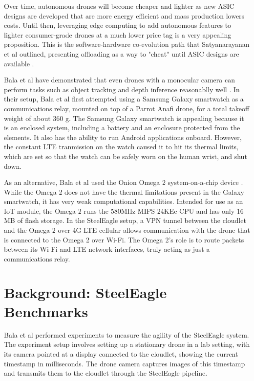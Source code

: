 Over time, autonomous drones will
become cheaper and lighter as new ASIC designs are developed that are more
energy efficient and mass production lowers costs. Until then, leveraging edge
computing to add autonomous features to lighter consumer-grade drones at a much
lower price tag is a very appealing proposition. This is the software-hardware
co-evolution path that Satyanarayanan et al outlined, presenting offloading as
a way to "cheat" until ASIC designs are available \cite{satya21}.

Bala et al have demonstrated that even drones with a monocular camera can
perform tasks such as object tracking and depth inference reasonablly
well \cite{bala2024}. In their setup, Bala et al first attempted using a Samsung
Galaxy smartwatch as a communications relay, mounted on top of a Parrot Anafi
drone, for a total takeoff weight of about 360 g. The Samsung Galaxy smartwatch
is appealing because it is an enclosed system, including a battery and an
enclosure protected from the elements. It also has the ability to run Android
applications onboard.  However, the constant LTE tranmission on the watch
caused it to hit its thermal limits, which are set so that the watch can be
safely worn on the human wrist, and shut down.

As an alternative, Bala et al used the Onion Omega 2 system-on-a-chip device
\cite{onionomega2}. While the Omega 2 does not have the thermal limitations
present in the Galaxy smartwatch, it has very weak computational capabilities.
Intended for use as an IoT module, the Omega 2 runs the 580MHz MIPS 24KEc CPU
and has only 16 MB of flash storage. In the SteelEagle setup, a VPN tunnel
between the cloudlet and the Omega 2 over 4G LTE cellular allows communication
with the drone that is connected to the Omega 2 over Wi-Fi. The Omega 2's role
is to route packets between its Wi-Fi and LTE network interfaces, truly acting
as just a communications relay.

\section{Background: SteelEagle Benchmarks}
Bala et al performed experiments to measure the agility of the SteelEagle
system. The experiment setup involves setting up a stationary drone in a lab
setting, with its camera pointed at a display connected to the cloudlet, showing
the current timestamp in milliseconds. The drone camera captures images of this
timestamp and transmits them to the cloudlet through the SteelEagle pipeline.

